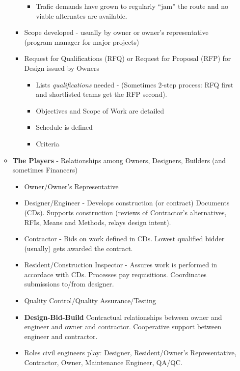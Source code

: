 \documentclass{article}
\begin{document}
\begin{itemize}
\begin{itemize}
\begin{itemize}
\begin{itemize}
                \item Trafic demands have grown to regularly ``jam'' the route and no viable alternates are available.
            \end{itemize}
            \item Scope developed - usually by owner or owner's representative (program manager for major projects)
            \item Request for Qualifications (RFQ) or Request for Proposal (RFP) for Design issued by Owners
            \begin{itemize}
                \item Lists \textit{qualifications} needed - (Sometimes 2-step process: RFQ first and shortlisted teams get the RFP second).
                \item Objectives and Scope of Work are detailed
                \item Schedule is defined
                \item Criteria
            \end{itemize}
        \end{itemize}
        \item \textbf{The Players} - Relationships among Owners, Designers, Builders (and sometimes Financers)
            \begin{itemize}
                \item Owner/Owner's Representative
                \item Designer/Engineer - Develops construction (or contract) Documents (CDs). Supports construction (reviews of Contractor's alternatives, RFIs, Means and Methods, relays design intent).
                \item Contractor - Bids on work defined in CDs. Lowest qualified bidder (usually) gets awarded the contract.
                \item Resident/Construction Inspector - Assures work is performed in accordace with CDs. Processes pay requisitions. Coordinates submissions to/from designer.
                \item Quality Control/Quality Assurance/Testing
                \item \textbf{Design-Bid-Build} Contractual relationships between owner and engineer and owner and contractor. Cooperative support between engineer and contractor.
                \item Roles civil engineers play: Designer, Resident/Owner's Representative, Contractor, Owner, Maintenance Engineer, QA/QC.

\end{itemize}
\end{itemize}
\end{itemize}
\end{document}

